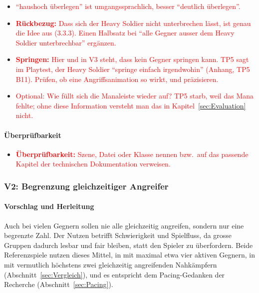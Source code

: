 \documentclass[../Main.tex]{subfiles}
\begin{document}
\begin{itemize}[leftmargin=1.5cm]
    \item \textcolor{red}{\enquote{haushoch überlegen} ist umgangssprachlich, besser \enquote{deutlich überlegen}.}
    \item \textcolor{red}{\textbf{Rückbezug:} Dass sich der Heavy Soldier nicht unterbrechen lässt, ist genau die Idee aus  (3.3.3). Einen Halbsatz bei \enquote{alle Gegner ausser dem Heavy Soldier unterbrechbar} ergänzen.}
    \item \textcolor{red}{\textbf{Springen:} Hier und in V3 steht, dass kein Gegner springen kann. TP5 sagt im Playtest, der Heavy Soldier \enquote{springe einfach irgendwohin} (Anhang, TP5 B11). Prüfen, ob eine Angriffsanimation so wirkt, und präzisieren.}
    \item \textcolor{red}{Optional: Wie füllt sich die Manaleiste wieder auf? TP5 starb, weil das Mana fehlte; ohne diese Information versteht man das in Kapitel~\ref{sec:Evaluation} nicht.}
\end{itemize}

\paragraph{Überprüfbarkeit}
\begin{itemize}[leftmargin=1.5cm]
    \item \textcolor{red}{\textbf{Überprüfbarkeit:} Szene, Datei oder Klasse nennen bzw.\ auf das passende Kapitel der technischen Dokumentation verweisen.}
\end{itemize}

\subsubsection{V2: Begrenzung gleichzeitiger Angreifer} \label{sec:V2}

\paragraph{Vorschlag und Herleitung}
Auch bei vielen Gegnern sollen nie alle gleichzeitig angreifen, sondern nur eine begrenzte Zahl. Der Nutzen betrifft Schwierigkeit und Spielfluss, da grosse Gruppen dadurch lesbar und fair bleiben, statt den Spieler zu überfordern. Beide Referenzspiele nutzen dieses Mittel, in  mit maximal etwa vier aktiven Gegnern, in  mit vermutlich höchstens zwei gleichzeitig angreifenden Nahkämpfern (Abschnitt~\ref{sec:Vergleich}), und es entspricht dem Pacing-Gedanken der Recherche (Abschnitt~\ref{sec:Pacing}).
\end{document}
